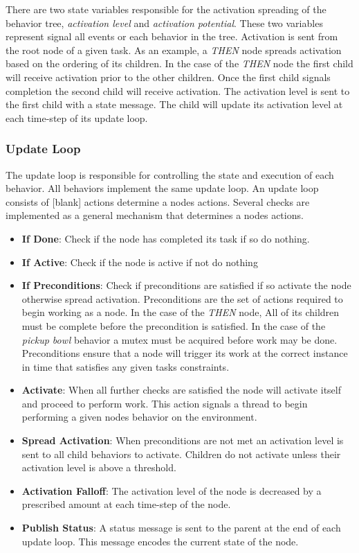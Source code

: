 \documentclass[conference]{article}
\begin{document}
There are two state variables responsible for the activation spreading of the behavior tree, \emph{activation level} and \emph{activation potential}. These two variables represent signal all events or each behavior in the tree. Activation is sent from the root node of a given task. As an example, a \emph{THEN} node spreads activation based on the ordering of its children. In the case of the \emph{THEN} node the first child will receive activation prior to the other children. Once the first child signals completion the second child will receive activation. The activation level is sent to the first child with a state message. The child will update its activation level at each time-step of its update loop.

\subsubsection{Update Loop}
The update loop is responsible for controlling the state and execution of each behavior. All behaviors implement the same update loop. An update loop consists of [blank] actions determine a nodes actions. Several checks are implemented as a general mechanism that determines a nodes actions.
\begin{itemize}
  \item \textbf{If Done}: Check if the node has completed its task if so do nothing.
  \item \textbf{If Active}: Check if the node is active if not do nothing
  \item \textbf{If Preconditions}: Check if preconditions are satisfied if so activate the node otherwise spread activation. Preconditions are the set of actions required  to begin working as a node. In the case of the \emph{THEN} node, All of its children must be complete before the precondition is satisfied. In the case of the \emph{pickup bowl} behavior a mutex must be acquired before work may be done. Preconditions ensure that a node will trigger its work at the correct instance in time that satisfies any given tasks constraints.
  \item \textbf{Activate}: When all further checks are satisfied the node will activate itself and proceed to perform work. This action signals a thread to begin performing a given nodes behavior on the environment.
  \item \textbf{Spread Activation}: When preconditions are not met an activation level is sent to all child behaviors to activate. Children do not activate unless their activation level is above a threshold.
  \item \textbf{Activation Falloff}: The activation level of the node is decreased by a prescribed amount at each time-step of the node.
  \item \textbf{Publish Status}: A status message is sent to the parent at the end of each update loop. This message encodes the current state of the node. 
\end{itemize}
\end{document}
